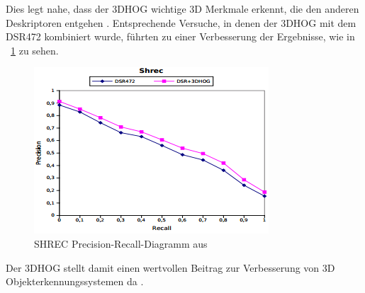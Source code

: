  Dies legt nahe, dass der 3DHOG wichtige 3D Merkmale erkennt, die den anderen Deskriptoren entgehen \cite{scherer2010histograms}.
\newline
Entsprechende Versuche, in denen der 3DHOG mit dem DSR472 kombiniert wurde, führten zu einer Verbesserung der Ergebnisse, wie in \figurename~\ref{SHREC_TEAM_3DHOG_DSR472} zu sehen. 

\begin{figure}[thpb]
	\centering
	\includegraphics[width=\linewidth]{2-Hauptteil/pics/SHREC_TEAM_3DHOG_DSR472.png}
	\caption{SHREC Precision-Recall-Diagramm aus \cite{scherer2010histograms}}
	\label{SHREC_TEAM_3DHOG_DSR472}
\end{figure}

Der 3DHOG stellt damit einen wertvollen Beitrag zur Verbesserung von 3D Objekterkennungssystemen da \cite{scherer2010histograms}.
